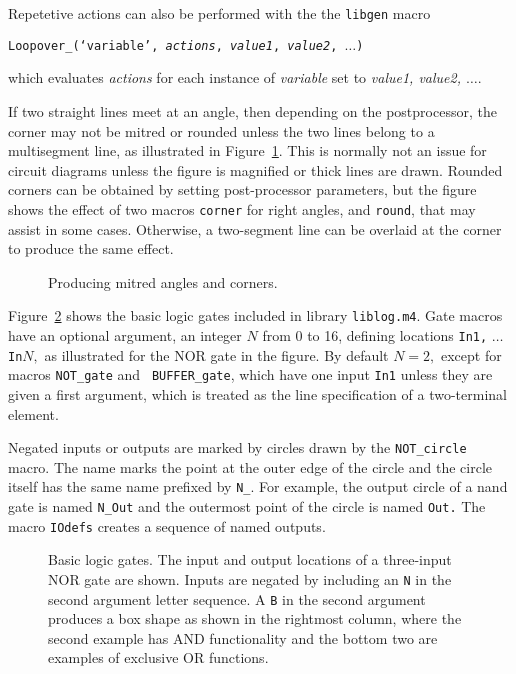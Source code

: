 Repetetive actions can also be performed with the the {\tt libgen} macro

{\tt Loopover\_(`{\sl variable}', {\sl actions}, {\sl value1}, {\sl value2},
  $\ldots$)}

\noindent
which evaluates {\sl actions} for each instance of {\sl variable} set
to {\sl value1, value2, $\ldots$}.

\pagebreak
If two straight lines meet at an angle, then depending on the postprocessor,
the corner may not be mitred or rounded unless the two lines belong to
a multisegment line, as illustrated in Figure~\ref{Corners}.  This is normally
not an issue for circuit diagrams unless the figure is magnified or thick
lines are drawn.  Rounded corners can be obtained by setting post-processor
parameters, but the figure shows the effect of
two macros {\tt corner} for right angles, and {\tt round},
that may assist in some cases. Otherwise, a two-segment line can be overlaid
at the corner to produce the same effect.
\begin{figure}[ht]
   
   \caption{Producing mitred angles and corners.}
   \label{Corners}
   \end{figure}

Figure~\ref{Logic} shows the basic logic gates included in
library {\tt liblog.m4}.
Gate macros have an optional argument, an integer $N$ from $0$ to 16,
defining locations {\tt In1,} $\ldots$ {\tt In}$N,$ as illustrated for
the NOR gate in the figure.  
By default $N=2,$ except for macros {\tt NOT\_gate} and {\tt
BUFFER\_gate}, which have one input {\tt In1} unless they are given a
first argument, which is treated as the line specification of a
two-terminal element.

Negated inputs or outputs are marked by circles drawn by the
\verb|NOT_circle| macro.  The name marks the point at the outer edge of the
circle and the circle itself has the same name prefixed by {\tt N\_}.
For example, the output circle of a nand gate is named
{\tt N\_Out} and the outermost point of the circle is named {\tt Out.}
The macro {\tt IOdefs} creates a sequence of named outputs.
\begin{figure}[t]
   
   \caption{Basic logic gates.  The input and output locations of
      a three-input NOR gate are shown.  Inputs are negated by
      including an {\tt N} in the second argument letter sequence.  A {\tt B}
      in the second argument produces a box shape as shown in the rightmost
      column, where the second example has AND functionality and
      the bottom two are examples of exclusive OR functions.}
   \label{Logic}
   \end{figure}

